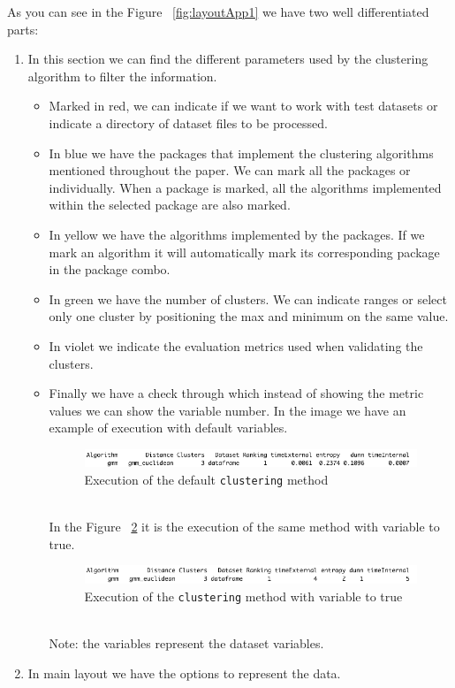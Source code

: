 As you can see in the Figure ~\ref{fig:layoutApp1} we have two well differentiated parts:
\begin{enumerate}
  \item In this section we can find the different parameters used by the clustering algorithm to filter the information.
  \begin{itemize}
  \item Marked in red, we can indicate if we want to work with test datasets or indicate a directory of dataset files to be processed.
  \item In blue we have the packages that implement the clustering algorithms mentioned throughout the paper. We can mark all the packages or individually. When a package is marked, all the algorithms implemented within the selected package are also marked.
  \item In yellow we have the algorithms implemented by the packages. If we mark an algorithm it will automatically mark its corresponding package in the package combo.
  \item In green we have the number of clusters. We can indicate ranges or select only one cluster by positioning the max and minimum on the same value.
  \item In violet we indicate the evaluation metrics used when validating the clusters.
  \item Finally we have a check through which instead of showing the metric values we can show the variable number. In the image we have an example of execution with default variables.
\begin{figure}[htbp]
  \centering
   \includegraphics[width=14cm height=0.5cm]{img/variable_false}
    \caption{Execution of the default \texttt{clustering} method}
    \label{fig:variable_false}%
\end{figure}
\\
In the Figure ~\ref{fig:variable_true} it is the execution of the same method with variable to true.
\begin{figure}[htbp]
  \centering
   \includegraphics[width=14cm height=0.5cm]{img/variable_true}
    \caption{Execution of the \texttt{clustering} method with variable to true}
    \label{fig:variable_true}%
\end{figure}
\\
Note: the variables represent the dataset variables.
\end{itemize}
  \item In main layout we have the options to represent the data.
  \begin{itemize}


\end{itemize}
\end{enumerate}
